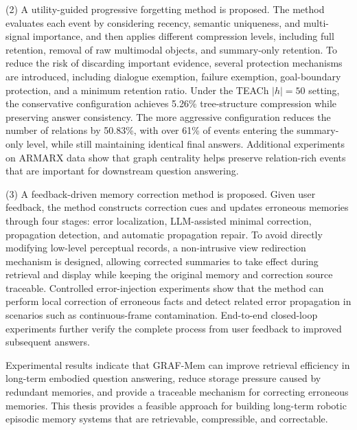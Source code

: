 \begin{engabstract}
(2) A utility-guided progressive forgetting method is proposed. The method evaluates each event by considering recency, semantic uniqueness, and multi-signal importance, and then applies different compression levels, including full retention, removal of raw multimodal objects, and summary-only retention. To reduce the risk of discarding important evidence, several protection mechanisms are introduced, including dialogue exemption, failure exemption, goal-boundary protection, and a minimum retention ratio. Under the TEACh $|h|=50$ setting, the conservative configuration achieves 5.26\% tree-structure compression while preserving answer consistency. The more aggressive configuration reduces the number of relations by 50.83\%, with over 61\% of events entering the summary-only level, while still maintaining identical final answers. Additional experiments on ARMARX data show that graph centrality helps preserve relation-rich events that are important for downstream question answering.

(3) A feedback-driven memory correction method is proposed. Given user feedback, the method constructs correction cues and updates erroneous memories through four stages: error localization, LLM-assisted minimal correction, propagation detection, and automatic propagation repair. To avoid directly modifying low-level perceptual records, a non-intrusive view redirection mechanism is designed, allowing corrected summaries to take effect during retrieval and display while keeping the original memory and correction source traceable. Controlled error-injection experiments show that the method can perform local correction of erroneous facts and detect related error propagation in scenarios such as continuous-frame contamination. End-to-end closed-loop experiments further verify the complete process from user feedback to improved subsequent answers.

Experimental results indicate that GRAF-Mem can improve retrieval efficiency in long-term embodied question answering, reduce storage pressure caused by redundant memories, and provide a traceable mechanism for correcting erroneous memories. This thesis provides a feasible approach for building long-term robotic episodic memory systems that are retrievable, compressible, and correctable.

\end{engabstract}
